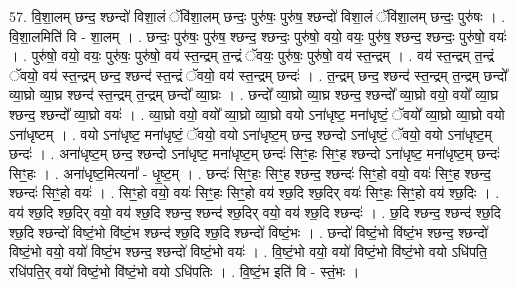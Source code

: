 \documentclass[17pt]{extarticle}
\begin{document}
57. वि॒शा॒लम् छन्द॒ श्छन्दो॑ विशा॒लं ॅवि॑शा॒लम् छन्दः॒ पुरु॑षः॒ पुरु॑ष॒ श्छन्दो॑ विशा॒लं ॅवि॑शा॒लम् छन्दः॒ पुरु॑षः । . वि॒शा॒लमिति॑ वि - शा॒लम् । . छन्दः॒ पुरु॑षः॒ पुरु॑ष॒ श्छन्द॒ श्छन्दः॒ पुरु॑षो॒ वयो॒ वयः॒ पुरु॑ष॒ श्छन्द॒ श्छन्दः॒ पुरु॑षो॒ वयः॑ । . पुरु॑षो॒ वयो॒ वयः॒ पुरु॑षः॒ पुरु॑षो॒ वय॑ स्त॒न्द्रम् त॒न्द्रं ॅवयः॒ पुरु॑षः॒ पुरु॑षो॒ वय॑ स्त॒न्द्रम् । . वय॑ स्त॒न्द्रम् त॒न्द्रं ॅवयो॒ वय॑ स्त॒न्द्रम् छन्द॒ श्छन्द॑ स्त॒न्द्रं ॅवयो॒ वय॑ स्त॒न्द्रम् छन्दः॑ । . त॒न्द्रम् छन्द॒ श्छन्द॑ स्त॒न्द्रम् त॒न्द्रम् छन्दो᳚ व्या॒घ्रो व्या॒घ्र श्छन्द॑ स्त॒न्द्रम् त॒न्द्रम् छन्दो᳚ व्या॒घ्रः । . छन्दो᳚ व्या॒घ्रो व्या॒घ्र श्छन्द॒ श्छन्दो᳚ व्या॒घ्रो वयो॒ वयो᳚ व्या॒घ्र श्छन्द॒ श्छन्दो᳚ व्या॒घ्रो वयः॑ । . व्या॒घ्रो वयो॒ वयो᳚ व्या॒घ्रो व्या॒घ्रो वयो ऽना॑धृष्ट॒ मना॑धृष्टं॒ ॅवयो᳚ व्या॒घ्रो व्या॒घ्रो वयो ऽना॑धृष्टम् । . वयो ऽना॑धृष्ट॒ मना॑धृष्टं॒ ॅवयो॒ वयो ऽना॑धृष्ट॒म् छन्द॒ श्छन्दो ऽना॑धृष्टं॒ ॅवयो॒ वयो ऽना॑धृष्ट॒म् छन्दः॑ । . अना॑धृष्ट॒म् छन्द॒ श्छन्दो ऽना॑धृष्ट॒ मना॑धृष्ट॒म् छन्दः॑ सिꣳ॒॒हः सिꣳ॒॒ह श्छन्दो ऽना॑धृष्ट॒ मना॑धृष्ट॒म् छन्दः॑ सिꣳ॒॒हः । . अना॑धृष्ट॒मित्यना᳚ - धृ॒ष्ट॒म् । . छन्दः॑ सिꣳ॒॒हः सिꣳ॒॒ह श्छन्द॒ श्छन्दः॑ सिꣳ॒॒हो वयो॒ वयः॑ सिꣳ॒॒ह श्छन्द॒ श्छन्दः॑ सिꣳ॒॒हो वयः॑ । . सिꣳ॒॒हो वयो॒ वयः॑ सिꣳ॒॒हः सिꣳ॒॒हो वय॑ श्छ॒दि श्छ॒दिर् वयः॑ सिꣳ॒॒हः सिꣳ॒॒हो वय॑ श्छ॒दिः । . वय॑ श्छ॒दि श्छ॒दिर् वयो॒ वय॑ श्छ॒दि श्छन्द॒ श्छन्द॑ श्छ॒दिर् वयो॒ वय॑ श्छ॒दि श्छन्दः॑ । . छ॒दि श्छन्द॒ श्छन्द॑ श्छ॒दि श्छ॒दि श्छन्दो॑ विष्टं॒भो वि॑ष्टं॒भ श्छन्द॑ श्छ॒दि श्छ॒दि श्छन्दो॑ विष्टं॒भः । . छन्दो॑ विष्टं॒भो वि॑ष्टं॒भ श्छन्द॒ श्छन्दो॑ विष्टं॒भो वयो॒ वयो॑ विष्टं॒भ श्छन्द॒ श्छन्दो॑ विष्टं॒भो वयः॑ । . वि॒ष्टं॒भो वयो॒ वयो॑ विष्टं॒भो वि॑ष्टं॒भो वयो ऽधि॑पति॒ रधि॑पति॒र् वयो॑ विष्टं॒भो वि॑ष्टं॒भो वयो ऽधि॑पतिः । . वि॒ष्टं॒भ इति॑ वि - स्तं॒भः । \newline
\end{document}
